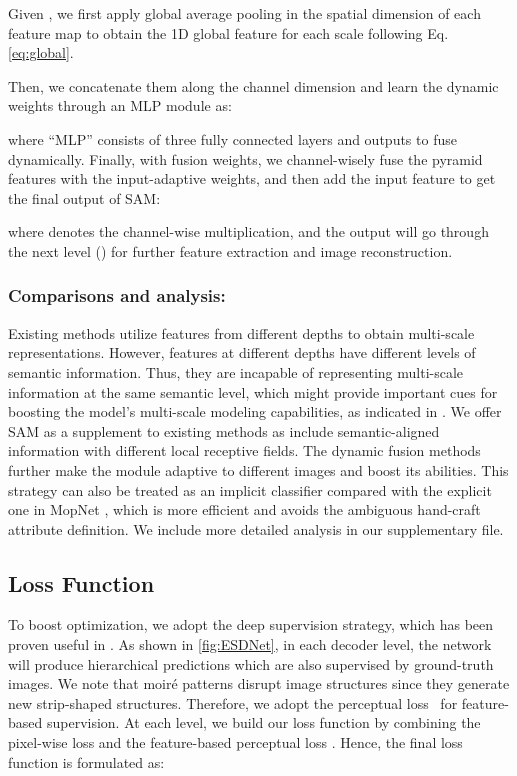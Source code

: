 \documentclass[runningheads]{llncs}
\begin{document}
Given , we first apply global average pooling in the spatial dimension of each feature map to obtain the 1D global feature  for each scale  following Eq. \eqref{eq:global}.



Then, we concatenate them along the channel dimension and learn the dynamic weights through an MLP module as:


where ``MLP'' consists of three fully connected layers and outputs  to fuse  dynamically. Finally, with fusion weights, we channel-wisely fuse the pyramid features with the input-adaptive weights, and then add the input feature  to get the final output of SAM:


\noindent where  denotes the channel-wise multiplication, and the output  will go through the next level () for further feature extraction and image reconstruction. 


\subsubsection{Comparisons and analysis:}
Existing methods \cite{zheng2020image,liu2020wavelet} utilize features from different depths to obtain multi-scale representations. However, features at different depths have different levels of semantic information. Thus, they are incapable of representing multi-scale information at the same semantic level, which might provide important cues for boosting the model's multi-scale modeling capabilities, as indicated in \cite{wang2020deep}.
We offer SAM as a supplement to existing methods as  include semantic-aligned information with different local receptive fields. The dynamic fusion methods further make the module adaptive to different images and boost its abilities. This strategy can also be treated as an implicit classifier compared with the explicit one in MopNet \cite{he2019mop}, which is more efficient and avoids the ambiguous hand-craft attribute definition. We include more detailed analysis in our supplementary file.


\subsection{Loss Function}

To boost optimization, we adopt the deep supervision strategy, which has been proven useful in \cite{zheng2020image}.
As shown in \cref{fig:ESDNet}, in each decoder level, the network will produce hierarchical predictions  which are also supervised by ground-truth images. We note that moiré patterns disrupt image structures since they generate new strip-shaped structures. Therefore, we adopt the perceptual loss~\cite{johnson2016perceptual} for feature-based supervision. 
At each level, we build our loss function by combining the pixel-wise  loss and the feature-based perceptual loss . Hence, the final loss function is formulated as:
\end{document}
